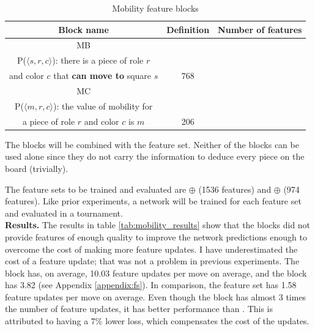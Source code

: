 \begin{table}[H]
\caption{Mobility feature blocks}
\label{tab:mobility_blocks}
\centering

\begin{tabular}{ccc}
\toprule
\bf Block name & \bf Definition & \bf Number of features \\
\toprule
MB & \makecell{
\vspace{0.2cm}
($\featureset{Squares} \times \featureset{Roles} \times \featureset{Colors})_P$ \\
P($\langle s, r, c \rangle$): there is a piece of role $r$\\ and color $c$ that \textbf{can move to} square $s$
} & 768 \\
\toprule
MC & \makecell{
\vspace{0.2cm}
$(\{0, 1, \hdots\} \times \featureset{Roles} \times \featureset{Colors})_{P}$\\
P($\langle m, r, c \rangle$): the value of mobility for\\
a piece of role $r$ and color $c$ is $m$
} & 206 \\
\bottomrule
\end{tabular}
\end{table}

The blocks will be combined with the  feature set. Neither of the blocks can be used alone since they do not carry the information to deduce every piece on the board (trivially).

The feature sets to be trained and evaluated are  $\oplus$  (1536 features) and  $\oplus$  (974 features). Like prior experiments, a network will be trained for each feature set and evaluated in a tournament. \\

\textbf{Results.} The results in table \ref{tab:mobility_results} show that the blocks did not provide features of enough quality to improve the network predictions enough to overcome the cost of making more feature updates. I have underestimated the cost of a feature update; that was not a problem in previous experiments. The block  has, on average, 10.03 feature updates per move on average, and the block  has 3.82 (see Appendix \ref{appendix:fs}). In comparison, the  feature set has 1.58 feature updates per move on average. Even though the block  has almost 3 times the number of feature updates, it has better performance than . This is attributed to having a 7\% lower loss, which compensates the cost of the updates. \\

